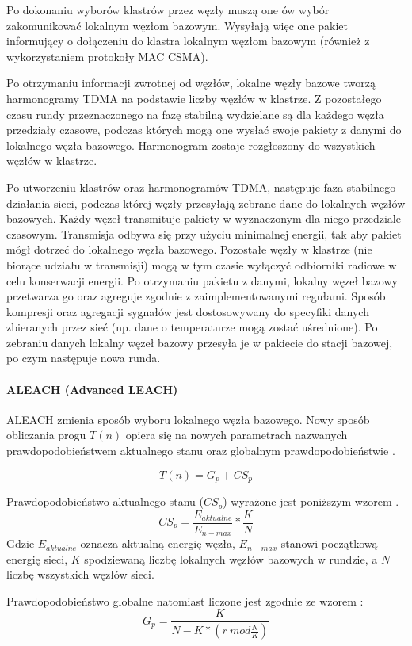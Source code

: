 Po dokonaniu wyborów klastrów przez węzły muszą one ów wybór zakomunikować lokalnym węzłom bazowym. Wysyłają więc one pakiet informujący o dołączeniu do klastra lokalnym węzłom bazowym (również z wykorzystaniem protokoły MAC CSMA).

Po otrzymaniu informacji zwrotnej od węzłów, lokalne węzły bazowe tworzą harmonogramy TDMA na podstawie liczby węzłów w klastrze. Z pozostałego czasu rundy przeznaczonego na fazę stabilną wydzielane są dla każdego węzła przedziały czasowe, podczas których mogą one wysłać swoje pakiety z danymi do lokalnego węzła bazowego. Harmonogram zostaje rozgłoszony do wszystkich węzłów w klastrze.

Po utworzeniu klastrów oraz harmonogramów TDMA, następuje faza stabilnego działania sieci, podczas której węzły przesyłają zebrane dane do lokalnych węzłów bazowych. Każdy węzeł transmituje pakiety w wyznaczonym dla niego przedziale czasowym. Transmisja odbywa się przy użyciu minimalnej energii, tak aby pakiet mógł dotrzeć do lokalnego węzła bazowego. Pozostałe węzły w klastrze (nie biorące udziału w transmisji) mogą w tym czasie wyłączyć odbiorniki radiowe w celu konserwacji energii. Po otrzymaniu pakietu z danymi, lokalny węzeł bazowy przetwarza go oraz agreguje zgodnie z zaimplementowanymi regułami. Sposób kompresji oraz agregacji sygnałów jest dostosowywany do specyfiki danych zbieranych przez sieć (np. dane o temperaturze mogą zostać uśrednione). Po zebraniu danych lokalny węzeł bazowy przesyła je w pakiecie do stacji bazowej, po czym następuje nowa runda.
\paragraph{ALEACH (Advanced LEACH)}
ALEACH zmienia sposób wyboru lokalnego węzła bazowego. Nowy sposób obliczania progu $T(n)$ opiera się na nowych parametrach nazwanych prawdopodobieństwem aktualnego stanu oraz globalnym prawdopodobieństwie \cite{Ali2008}.

\[
	T(n) = G_{p} + CS_{p}
\]

Prawdopodobieństwo aktualnego stanu ($CS_{p}$) wyrażone jest poniższym wzorem \cite{Ali2008}.
\[
	CS_{p} = \frac{E_{aktualne}}{E_{n-max}}*\frac{K}{N}
\]
Gdzie $E_{aktualne}$ oznacza aktualną energię węzła, $E_{n-max}$ stanowi początkową energię sieci, $K$ spodziewaną liczbę lokalnych węzłów bazowych w rundzie, a $N$ liczbę wszystkich węzłów sieci.

Prawdopodobieństwo globalne natomiast liczone jest zgodnie ze wzorem \cite{Ali2008}:
\[
	G_{p} = \frac{K}{N - K * (r \:mod \frac{N}{K})}
\]

